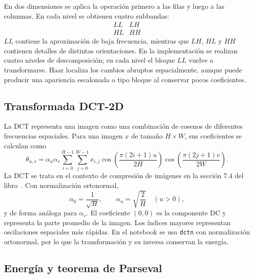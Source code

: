 \documentclass[11pt,a4paper]{article}
\begin{document}
En dos dimensiones se aplica la operación primero a las filas y luego a las columnas. En cada nivel se obtienen cuatro subbandas:
\begin{equation}
    \begin{array}{c|c}
        LL & LH\\
        \hline
        HL & HH
    \end{array}
    \label{eq:subbandas}
\end{equation}
$LL$ contiene la aproximación de baja frecuencia, mientras que $LH$, $HL$ y $HH$ contienen detalles de distintas orientaciones. En la implementación se realizan cuatro niveles de descomposición; en cada nivel el bloque $LL$ vuelve a transformarse. Haar localiza los cambios abruptos espacialmente, aunque puede producir una apariencia escalonada o tipo bloque al conservar pocos coeficientes.

\subsection{Transformada DCT-2D}

La DCT representa una imagen como una combinación de cosenos de diferentes frecuencias espaciales. Para una imagen $x$ de tamaño $H\times W$, sus coeficientes se calculan como
\begin{equation}
    \theta_{u,v}=\alpha_u\alpha_v
    \sum_{i=0}^{H-1}\sum_{j=0}^{W-1}x_{i,j}
    \cos\left(\frac{\pi(2i+1)u}{2H}\right)
    \cos\left(\frac{\pi(2j+1)v}{2W}\right).
    \label{eq:dct}
\end{equation}
La DCT se trata en el contexto de compresión de imágenes en la sección 7.4 del libro~\cite{book,dct}.
Con normalización ortonormal,
\begin{equation}
    \alpha_0=\frac{1}{\sqrt{H}},
    \qquad
    \alpha_u=\sqrt{\frac{2}{H}}\quad (u>0),
    \label{eq:dct-alpha}
\end{equation}
y de forma análoga para $\alpha_v$. El coeficiente $(0,0)$ es la componente DC y representa la parte promedio de la imagen. Los índices mayores representan oscilaciones espaciales más rápidas. En el notebook se usa \texttt{dctn} con normalización ortonormal, por lo que la transformación y su inversa conservan la energía.

\subsection{Energía y teorema de Parseval}
\end{document}
